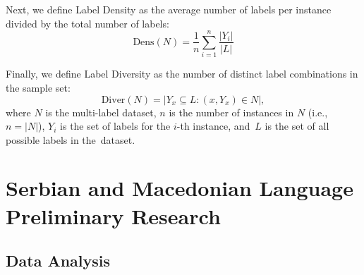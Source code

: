 \documentclass[make,article,accept,pdftex,moreauthors]{Definitions/mdpi}
\begin{document}
Next, we define Label Density as the average number of labels per instance divided by the total number of  labels:
\begin{equation}
\text{Dens}(N) = \frac{1}{n} \sum_{i=1}^{n} \frac{|Y_i|}{|L|}
\end{equation}

Finally, we define Label Diversity as the number of distinct label combinations in the sample set:
\begin{equation}
\text{Diver}(N) = |{Y_x \subseteq L: (x, Y_x) \in N}|,
\end{equation}
where $N$ is the multi-label dataset, $n$ is the number of instances in $N$ (i.e., $n = |N|$), $Y_i$ is the set of labels for the $i$-th instance, and~$L$ is the set of all possible labels in the~dataset.

\section[\appendixname~\thesection]{Serbian and Macedonian Language Preliminary Research}
\label{subsec:sr_mk_preliminary}
\subsection[\appendixname~\thesubsection]{Data Analysis}
\label{subsec:sr_mk_data_analysis}
\end{document}
